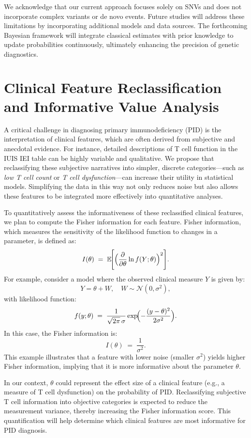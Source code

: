\documentclass[a4paper,12pt]{article}
\begin{document}
We acknowledge that our current approach focuses solely on SNVs and does not incorporate complex variants or de novo events. Future studies will address these limitations by incorporating additional models and data sources. The forthcoming Bayesian framework will integrate classical estimates with prior knowledge to update probabilities continuously, ultimately enhancing the precision of genetic diagnostics.

\section{Clinical Feature Reclassification and Informative Value Analysis}

A critical challenge in diagnosing primary immunodeficiency (PID) is the interpretation of clinical features, which are often derived from subjective and anecdotal evidence. For instance, detailed descriptions of T cell function in the IUIS IEI table can be highly variable and qualitative. We propose that reclassifying these subjective narratives into simpler, discrete categories—such as \textit{low T cell count} or \textit{T cell dysfunction}—can increase their utility in statistical models. Simplifying the data in this way not only reduces noise but also allows these features to be integrated more effectively into quantitative analyses.

To quantitatively assess the informativeness of these reclassified clinical features, we plan to compute the Fisher information for each feature. Fisher information, which measures the sensitivity of the likelihood function to changes in a parameter, is defined as:
\[
I(\theta) \;=\; \mathbb{E}\!\Biggl[\Bigl(\frac{\partial}{\partial \theta}\ln f(Y;\theta)\Bigr)^{2}\Biggr].
\]
For example, consider a model where the observed clinical measure \(Y\) is given by:
\[
Y = \theta + W,\quad W \sim \mathcal{N}(0,\sigma^{2}),
\]
with likelihood function:
\[
f(y;\theta) \;=\; \frac{1}{\sqrt{2\pi}\,\sigma}\exp\!\Bigl(-\frac{(y-\theta)^{2}}{2\sigma^{2}}\Bigr).
\]
In this case, the Fisher information is:
\[
I(\theta) \;=\; \frac{1}{\sigma^{2}}.
\]
This example illustrates that a feature with lower noise (smaller \(\sigma^{2}\)) yields higher Fisher information, implying that it is more informative about the parameter \(\theta\).

In our context, \(\theta\) could represent the effect size of a clinical feature (e.g., a measure of T cell dysfunction) on the probability of PID. Reclassifying subjective T cell information into objective categories is expected to reduce the measurement variance, thereby increasing the Fisher information score. This quantification will help determine which clinical features are most informative for PID diagnosis.
\end{document}

